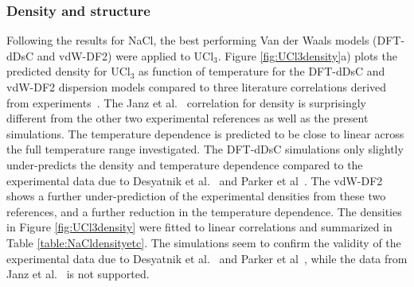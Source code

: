 \documentclass[preprint,3p,10pt,onecolumn,number,sort&compress]{elsarticle}
\begin{document}
{\subsubsection{Density and structure}
Following the results for NaCl, the best performing Van der Waals models (DFT-dDsC and vdW-DF2) were applied to UCl$_3$. Figure \ref{fig:UCl3density}a) plots the predicted density for UCl$_3$ as function of temperature for the DFT-dDsC and vdW-DF2 dispersion models compared to three literature correlations derived from experiments~\cite{Janz1988,Desyatnik,Parker}. The Janz et al.~\cite{Janz1988} correlation for density is surprisingly different from the other two experimental references as well as the present simulations. The temperature dependence is predicted to be close to linear across the full temperature range investigated. The DFT-dDsC simulations only slightly under-predicts the density and temperature dependence compared to the experimental data due to Desyatnik et al.~\cite{Desyatnik} and Parker et al~\cite{Parker}. The vdW-DF2 shows a further under-prediction of the experimental densities from these two references, and a further reduction in the temperature dependence. The densities in Figure \ref{fig:UCl3density} were fitted to linear correlations and summarized in Table \ref{table:NaCldensityetc}. The simulations seem to confirm the validity of the experimental data due to Desyatnik et al.~\cite{Desyatnik} and Parker et al~\cite{Parker}, while the data from Janz et al.~\cite{Janz1988} is not supported.



 
}
\end{document}
